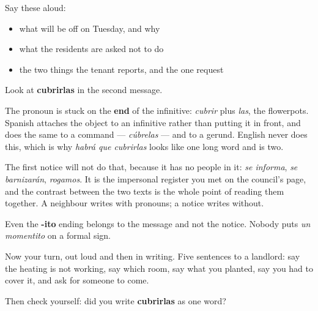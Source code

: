 Say these aloud:

\begin{itemize}
\raggedright
  \item what will be off on Tuesday, and why
  \item what the residents are asked not to do
  \item the two things the tenant reports, and the one request
\end{itemize}

\begin{culture}
Look at \textbf{cubrirlas} in the second message.

The pronoun is stuck on the \textbf{end} of the infinitive: \emph{cubrir} plus \emph{las}, the flowerpots. Spanish attaches the object to an infinitive rather than putting it in front, and does the same to a command — \emph{cúbrelas} — and to a gerund. English never does this, which is why \emph{habrá que cubrirlas} looks like one long word and is two.

The first notice will not do that, because it has no people in it: \emph{se informa}, \emph{se barnizarán}, \emph{rogamos}. It is the impersonal register you met on the council's page, and the contrast between the two texts is the whole point of reading them together. A neighbour writes with pronouns; a notice writes without.

Even the \textbf{-ito} ending belongs to the message and not the notice. Nobody puts \emph{un momentito} on a formal sign.
\end{culture}

\begin{tcolorbox}[breakable,colback=teal!4,colframe=teal!35!black,title={Before you move on}]
Now your turn, out loud and then in writing. Five sentences to a landlord: say the heating is not working, say which room, say what you planted, say you had to cover it, and ask for someone to come.

Then check yourself: did you write \textbf{cubrirlas} as one word?
\end{tcolorbox}
